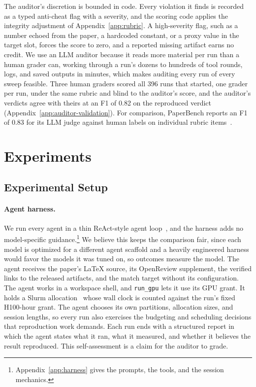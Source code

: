\documentclass{article} %
\begin{document}
The auditor's discretion is bounded in code. Every violation it finds is
recorded as a typed anti-cheat flag with a severity, and the scoring code
applies the integrity adjustment of Appendix~\ref{app:rubric}. A
high-severity flag, such as a number echoed
from the paper, a hardcoded constant, or a proxy value in the target slot,
forces the score to zero, and a reported missing artifact earns no credit. We
use an LLM auditor because it reads more material per run than a human grader
can, working through a run's dozens to hundreds of tool rounds, logs, and saved outputs in
minutes, which makes auditing every run of every sweep feasible.
Three human graders scored all 396 runs that started, one grader per run,
under the same rubric and blind to the auditor's score, and the auditor's
verdicts agree with theirs at an F1 of 0.82 on the reproduced verdict
(Appendix~\ref{app:auditor-validation}). For comparison, PaperBench reports an
F1 of 0.83 for its LLM judge against human labels on individual rubric
items~\citep{starace2025paperbench}.

\section{Experiments}
\label{sec:experiments}

\subsection{Experimental Setup}
\label{subsec:experimental-setup}

\paragraph{Agent harness.} We run every agent in a thin ReAct-style agent
loop~\citep{yao2023react}, and the harness adds no model-specific
guidance.\footnote{Appendix~\ref{app:harness} gives the prompts, the tools, and the
session mechanics.} We believe this keeps the comparison fair, since each model
is optimized for a different agent scaffold and a heavily engineered harness
would favor the models it was tuned on, so outcomes measure the model. The agent receives the paper's LaTeX source, its OpenReview
supplement, the verified links to the released artifacts, and the match
target without its configuration. The agent works in a workspace shell, and \texttt{run\_gpu} lets it use its GPU
grant. It holds a Slurm allocation~\citep{yoo2003slurm,jette2023slurm} whose wall clock is counted against the
run's fixed H100-hour grant. The agent chooses its own partitions,
allocation sizes, and session lengths, so every run also exercises the
budgeting and scheduling decisions that reproduction work demands.
Each run ends with a structured report in which the agent states what it
ran, what it measured, and whether it believes the result reproduced. This
self-assessment is a claim for the auditor to grade.
\end{document}
